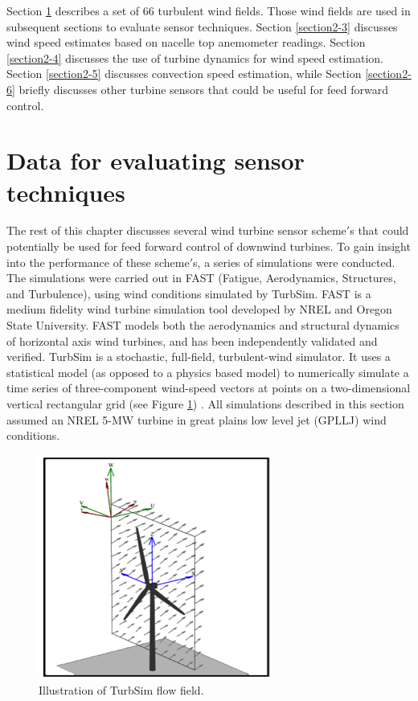 Section \ref{section2-2} describes a set of 66 turbulent wind fields. Those wind fields are used in subsequent sections to evaluate sensor techniques. Section \ref{section2-3} discusses wind speed estimates based on nacelle top anemometer readings. Section \ref{section2-4} discusses the use of turbine dynamics for wind speed estimation. Section \ref{section2-5} discusses convection speed estimation, while Section \ref{section2-6} briefly discusses other turbine sensors that could be useful for feed forward control.




\section{Data for evaluating sensor techniques} \label{section2-2}

The rest of this chapter discusses several wind turbine sensor scheme$'$s that could potentially be used for feed forward control of downwind turbines. To gain insight into the performance of these scheme$'$s, a series of simulations were conducted. The simulations were carried out in FAST (Fatigue, Aerodynamics, Structures, and Turbulence), using wind conditions simulated by TurbSim. FAST is a medium fidelity wind turbine simulation tool developed by NREL and Oregon State University. FAST models both the aerodynamics and structural dynamics of horizontal axis wind turbines, and has been independently validated and verified\cite{manjock2005}. TurbSim is a stochastic, full-field, turbulent-wind simulator. It uses a statistical model (as opposed to a physics based model) to numerically simulate a time series of three-component wind-speed vectors at points on a two-dimensional vertical rectangular grid (see Figure \ref{fig2-2}) \cite{jonkman2012}. All simulations described in this section assumed an NREL 5-MW turbine in great plains low level jet (GPLLJ) wind conditions.

\begin{figure}[htbp]
	\centering
		\includegraphics[width=.5\linewidth]{Figures/ch2Figures/fig2-2.png}
		
	\caption{Illustration of TurbSim flow field.\cite{jonkman2012}}
	\label{fig2-2}
\end{figure}

